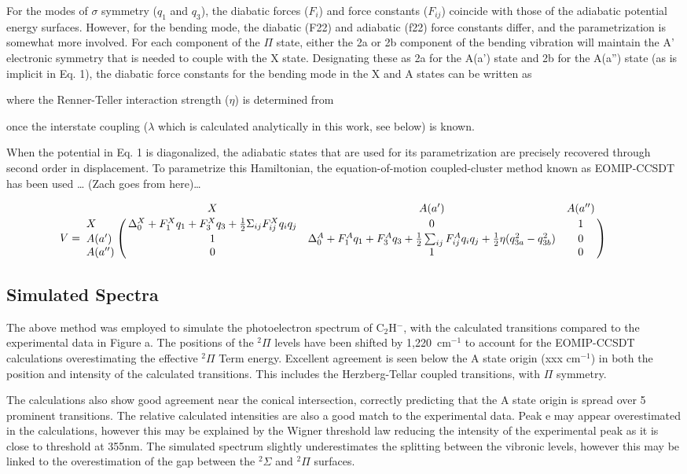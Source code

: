 \documentclass[journal=jpcafh,manuscript=article,layout=onecolumn, 12pt]{achemso}
\begin{document}
For the modes of $\sigma$ symmetry ($q_1$ and $q_3$), the diabatic forces ($F_i$) and force constants ($F_{ij}$) coincide with those of the adiabatic potential energy surfaces.   However, for the bending mode, the diabatic (F22) and adiabatic (f22) force constants differ, and the parametrization is somewhat more involved.   For each component of the $\Pi$ state, either the 2a or 2b component of the bending vibration will maintain the A' electronic symmetry that is needed to couple with the X state.  Designating these as 2a for the A(a') state and 2b for the A(a'') state (as is implicit in Eq. 1), the diabatic force constants for the bending mode in the X and A states can be written as 

where the Renner-Teller interaction strength ($\eta$) is determined from 

once the interstate coupling ($\lambda$ which is calculated analytically in this work, see below) is known.

When the potential in Eq. 1 is diagonalized, the adiabatic states that are used for its parametrization are precisely recovered through second order in displacement. To parametrize this Hamiltonian, the equation-of-motion coupled-cluster method known as EOMIP-CCSDT has been used … (Zach goes from here)…



\begin{equation}
V = \bordermatrix{ & X & A(a') & A(a'') \cr
	X & {\Delta_0^X+F_1^Xq_1+F_3^Xq_3+   
		\frac{1}{2} \Sigma_{ij}F^X_{ij}q_iq_j}& 0 & 1 \cr
	A(a') & 1 & \Delta^A_0+F^A_1q_1+F^A_3q_3+\frac{1}{2}\sum_{ij}F^A_{ij}q_iq_j+\frac{1}{2}\eta(q_{3a}^2-q_{3b}^2) & 0 \cr
	A(a'') & 0 & 1 & 0 } \qquad
\end{equation}

\subsection{Simulated Spectra}
The above method was employed to simulate the photoelectron spectrum of C$_2$H$^-$, with the calculated transitions compared to the experimental data in Figure a. The positions of the $^2\Pi$ levels have been shifted by 1,220~cm$^{-1}$ to account for the EOMIP-CCSDT calculations overestimating the effective $^2\Pi$ Term energy. Excellent agreement is seen below the A state origin (xxx cm$^{-1}$) in both the position and intensity of the calculated transitions. This includes the Herzberg-Tellar coupled transitions, with $\Pi$ symmetry. 

The calculations also show good agreement near the conical intersection, correctly predicting that the A state origin is spread over 5 prominent transitions. The relative calculated intensities are also a good match to the experimental data. Peak e may appear overestimated in the calculations, however this may be explained by the Wigner threshold law reducing the intensity of the experimental peak as it is close to threshold at 355nm. The simulated spectrum slightly underestimates the splitting between the vibronic levels, however this may be linked to the overestimation of the gap between the $^2\Sigma$ and $^2\Pi$ surfaces. 
\end{document}
